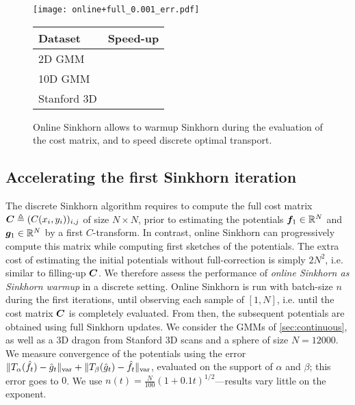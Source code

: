 \begin{figure}[t]
    \begin{minipage}{.7\textwidth}
    \texttt{[image: online+full\_0.001\_err.pdf]}
    \caption{Online Sinkhorn allows to warmup Sinkhorn during the evaluation of the cost matrix, and to speed discrete optimal transport.}
    \label{fig:warmup}
    \end{minipage}%
    \hfill
    \begin{minipage}{.25\textwidth}
        \small
        \begin{tabular}{lc}
            Dataset & Speed-up\\
            \toprule
            2D GMM & \\
            10D GMM & \\
            Stanford 3D & \\
            \bottomrule
        \end{tabular}
    \end{minipage}
\end{figure}


\subsection{Accelerating the first Sinkhorn iteration}\label{sec:accelerating}

The discrete Sinkhorn algorithm requires to compute the full cost matrix $\bm{C}
\triangleq (C(x_i,y_i))_{i,j}$  of size $N \times N$, prior to estimating the
potentials $\bm{f}_1 \in \mathbb{R}^N$ and $\bm{g}_1 \in \mathbb{R}^N$ by a first $C$-transform. In
contrast, online Sinkhorn can progressively compute this matrix while computing
first sketches of the potentials. The extra cost of estimating the initial potentials
without full-correction is simply $2 N^2$, i.e. similar to filling-up $\bm{C}$. We
therefore assess the performance of \textit{online Sinkhorn as Sinkhorn warmup}
in a discrete setting. Online Sinkhorn is run with batch-size $n$ during the
first iterations, until observing each sample of $[1,N]$, i.e. until the cost
matrix $\bm{C}$ is completely evaluated. From then, the
subsequent potentials are obtained using full Sinkhorn updates. We consider the
GMMs of \autoref{sec:continuous}, as well as a 3D dragon from Stanford 3D scans
\cite{turk1994zippered} and a sphere of size $N=12000$. We measure
convergence of the potentials using the error $\Vert
T_{\alpha}(\hat f_t) - \hat g_t \Vert_{\text{\upshape var}} + \Vert T_{\beta}(\hat
g_t) - \hat f_t \Vert_{\text{\upshape var}}$, evaluated on the support of $\alpha$ and $\beta$; this error
goes to $0$. We use $n(t) = \frac{N}{100} (1+0.1t)^{1/2}$---results vary little on the exponent.


